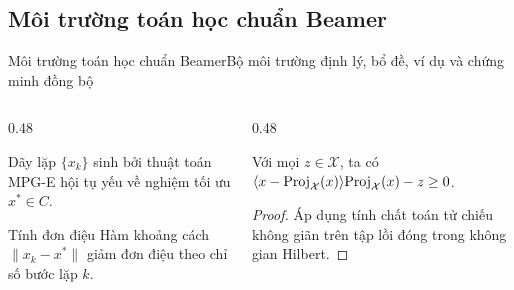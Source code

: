 \documentclass[aspectratio=169,10pt]{beamer}
\begin{document}
\subsection{Môi trường toán học chuẩn Beamer}
\begin{frame}{Môi trường toán học chuẩn Beamer}{Bộ môi trường định lý, bổ đề, ví dụ và chứng minh đồng bộ}
  \scriptsize
  \begin{columns}[T]
    \begin{column}{0.48\textwidth}
      \begin{theorem}
        Dãy lặp $\{x_k\}$ sinh bởi thuật toán MPG-E hội tụ yếu về nghiệm tối ưu $x^* \in C$.
      \end{theorem}
      \vskip 2pt
      \begin{exampleblock}{Tính đơn điệu}
        Hàm khoảng cách $\|x_k - x^*\|$ giảm đơn điệu theo chỉ số bước lặp $k$.
      \end{exampleblock}
    \end{column}

    \begin{column}{0.48\textwidth}
      \begin{lemma}
        Với mọi $z \in \mathcal{X}$, ta có $\langle x - \mathrm{Proj}_{\mathcal{X}}(x)\rangle{\mathrm{Proj}_{\mathcal{X}}(x) - z} \ge 0$.
      \end{lemma}
      \vskip 2pt
      \begin{proof}
        Áp dụng tính chất toán tử chiếu không giãn trên tập lồi đóng trong không gian Hilbert.
      \end{proof}
    \end{column}
  \end{columns}
\end{frame}
\end{document}
